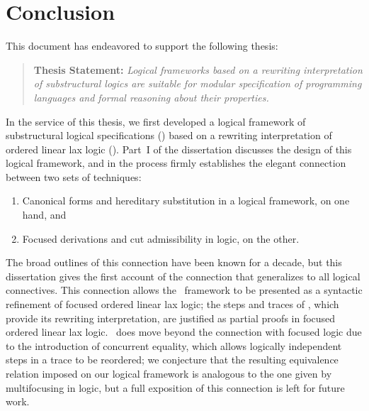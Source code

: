 \chapter{Conclusion}
\label{chapter-conclusion}

This document has endeavored to support the following thesis:
\smallskip
\begin{quote} {\bf Thesis Statement:} {\it Logical frameworks based on
    a rewriting interpretation of substructural logics are suitable
    for modular specification of programming languages and formal
    reasoning about their properties.}
\end{quote}
\bigskip


In the service of this thesis, we first developed a logical framework
of substructural logical specifications (\sls) based on a rewriting
interpretation of ordered linear lax logic (\ollll). Part~I of the
dissertation discusses the design of this logical framework, and in
the process firmly establishes the elegant connection between two sets
of techniques:

\smallskip
\begin{enumerate}
\item Canonical forms and hereditary
substitution in a logical framework, on one hand, and 
\item Focused derivations and cut
admissibility in logic, on the other.
\end{enumerate}

\smallskip
\noindent 
The broad outlines of this connection have been known for a decade,
but this dissertation gives the first account of the connection that
generalizes to all logical connectives. This connection allows the
\sls~framework to be presented as a syntactic refinement of focused
ordered linear lax logic; the steps and traces of \sls, which provide
its rewriting interpretation, are justified as partial proofs in
focused ordered linear lax logic. \sls~does move beyond the connection
with focused logic due to the introduction of concurrent equality,
which allows logically independent steps in a trace to be reordered;
we conjecture that the resulting equivalence relation imposed on our
logical framework is analogous to the one given by multifocusing in
logic, but a full exposition of this connection is left for future
work.

